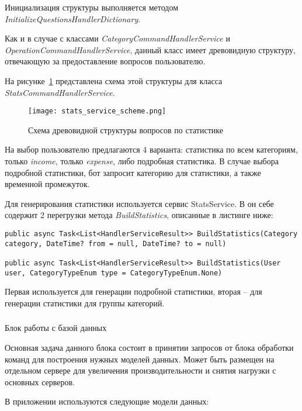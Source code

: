 Инициализация структуры выполняется методом \emph{InitializeQuestionsHandlerDictionary}.

Как и в случае с классами \emph{CategoryCommandHandlerService} и \emph{OperationCommandHandlerService}, данный класс имеет древовидную структуру, отвечающую за предоставление вопросов пользователю.

На рисунке~\ref{fig:design:server:stats_service_scheme} представлена схема этой структуры для класса \emph{StatsCommandHandlerService}.

\begin{figure}[!h]
\centering
	\texttt{[image: stats\_service\_scheme.png]}
	\caption{Схема древовидной структуры вопросов по статистике}
	\label{fig:design:server:stats_service_scheme}
\end{figure}

На выбор пользователю предлагаются 4 варианта: статистика по всем категориям, только \emph{income}, только \emph{expense}, либо подробная статистика. В случае выбора подробной статистики, бот запросит категорию для статистики, а также временной промежуток.

Для генерирования статистики используется сервис StatsService. В он себе содержит 2 перегрузки метода \emph{BuildStatistics}, описанные в листинге ниже:

\lstset{style=sharpc}
\begin{lstlisting}
public async Task<List<HandlerServiceResult>> BuildStatistics(Category category, DateTime? from = null, DateTime? to = null)

public async Task<List<HandlerServiceResult>> BuildStatistics(User user, CategoryTypeEnum type = CategoryTypeEnum.None)
\end{lstlisting}

Первая используется для генерации подробной статистики, вторая – для
генерации статистики для группы категорий.

\subsubsection{} Блок работы с базой данных
\label{sec:design:server:db}

Основная задача данного блока состоит в принятии запросов от блока
обработки команд для построения нужных моделей данных. Может быть
размещен на отдельном сервере для увеличения производительности и снятия нагрузки с основных серверов.

В приложении используются следующие модели данных:

